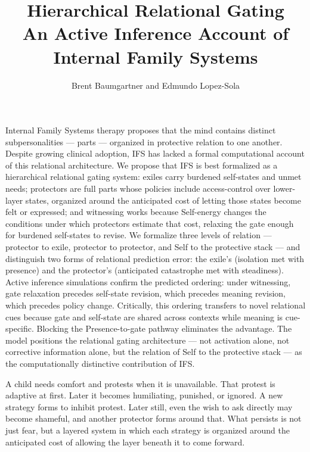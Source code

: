 \documentclass[11pt,a4paper]{article}
\title{\textbf{Hierarchical Relational Gating}\\[0.4em]\large An Active
Inference Account of Internal Family Systems}
\author{Brent Baumgartner and Edmundo Lopez-Sola}
\date{}
\makeatletter
\renewcommand{\maketitle}{
  \thispagestyle{empty}
  \begin{center}
    {\LARGE\bfseries \@title\par}
    \vspace{0.55em}
    {\large \@author\par}
    \vspace{1.4em}
  \end{center}
}
\renewcommand\section{\@startsection{section}{1}{0pt}{2.3ex plus 0.6ex minus 0.2ex}{1.1ex plus 0.2ex}{\large\bfseries}}
\makeatother
\begin{document}
\maketitle

Internal Family Systems therapy proposes that the mind contains distinct
subpersonalities --- parts --- organized in protective relation to one
another. Despite growing clinical adoption, IFS has lacked a formal
computational account of this relational architecture. We propose that
IFS is best formalized as a hierarchical relational gating system:
exiles carry burdened self-states and unmet needs; protectors are full
parts whose policies include access-control over lower-layer states,
organized around the anticipated cost of letting those states become
felt or expressed; and witnessing works because Self-energy changes the
conditions under which protectors estimate that cost, relaxing the gate
enough for burdened self-states to revise. We formalize three levels of
relation --- protector to exile, protector to protector, and Self to the
protective stack --- and distinguish two forms of relational prediction
error: the exile's (isolation met with presence) and the protector's
(anticipated catastrophe met with steadiness). Active inference
simulations confirm the predicted ordering: under witnessing, gate
relaxation precedes self-state revision, which precedes meaning
revision, which precedes policy change. Critically, this ordering
transfers to novel relational cues because gate and self-state are
shared across contexts while meaning is cue-specific. Blocking the
Presence-to-gate pathway eliminates the advantage. The model positions
the relational gating architecture --- not activation alone, not
corrective information alone, but the relation of Self to the protective
stack --- as the computationally distinctive contribution of IFS.

\section{Introduction}\label{introduction}

A child needs comfort and protests when it is unavailable. That protest
is adaptive at first. Later it becomes humiliating, punished, or
ignored. A new strategy forms to inhibit protest. Later still, even the
wish to ask directly may become shameful, and another protector forms
around that. What persists is not just fear, but a layered system in
which each strategy is organized around the anticipated cost of allowing
the layer beneath it to come forward.
\end{document}
